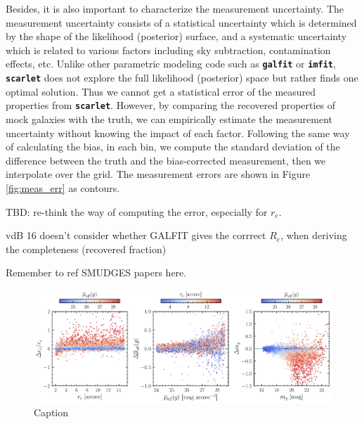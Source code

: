 \documentclass[twocolumn,astrosymb,twocolappendix]{aastex631}
\newcommand{\code}[1]{\textbf{\texttt{#1}}}
\begin{document}
\begin{CJK*}{UTF8}{gbsn}
Besides, it is also important to characterize the measurement uncertainty. The measurement uncertainty consists of a statistical uncertainty which is determined by the shape of the likelihood (posterior) surface, and a systematic uncertainty which is related to various factors including sky subtraction, contamination effects, etc. Unlike other parametric modeling code such as \code{galfit} or \code{imfit}, \code{scarlet} does not explore the full likelihood (posterior) space but rather finds one optimal solution. Thus we cannot get a statistical error of the measured properties from \code{scarlet}. However, by comparing the recovered properties of mock galaxies with the truth, we can empirically estimate the measurement uncertainty without knowing the impact of each factor. Following the same way of calculating the bias, in each bin, we compute the standard deviation of the difference between the truth and the bias-corrected measurement, then we interpolate over the grid. The measurement errors are shown in Figure \ref{fig:meas_err} as contours. 



TBD: re-think the way of computing the error, especially for $r_e$. 


vdB 16 doesn't consider whether GALFIT gives the corrrect $R_e$, when deriving the completeness (recovered fraction)

Remember to ref SMUDGES papers here.

\begin{figure}
	\vbox{ 
		\centering
		\includegraphics[width=1\linewidth]{meas_bias.pdf}
	}
    \caption{Caption}
    \label{fig:meas_bias}
\end{figure}



\end{CJK*}
\end{document}
